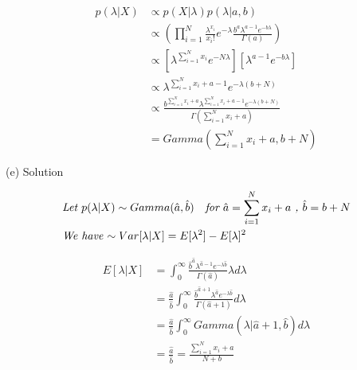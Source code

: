 \documentclass[11pt]{report}
\begin{document}
\begin{equation*}
\begin{split}
p(\lambda|X) &\propto p(X|\lambda) p(\lambda|a,b) \\
&\propto (\prod_{i=1}^N\frac{\lambda^{x_i}}{x_i!} e^{-\lambda} \frac{b^a\lambda^{a-1}e^{-b\lambda}}{\Gamma(a)}) \\
&\propto [\lambda^{\sum_{i=1}^Nx_i} e^{-N\lambda}][\lambda^{a-1}e^{-b\lambda}] \\
&\propto \lambda^{\sum_{i=1}^Nx_i + a - 1} e^{-\lambda(b + N)} \\
&\propto \frac{b^{\sum_{i=1}^Nx_i + a}\lambda^{\sum_{i=1}^Nx_i + a - 1} e^{-\lambda(b + N)}}{\Gamma(\sum_{i=1}^Nx_i + a)} \\
& = \textit{Gamma}(\sum_{i=1}^Nx_i + a, b + N)
\end{split}
\end{equation*}

\justify
(e) Solution

\begin{align*}
&\textit{Let $p(\lambda|X) \sim Gamma(\hat{a}, \hat{b})$ \; for $\hat{a} = \sum_{i=1}^Nx_i + a$ , $\hat{b} = b+ N $} \\
&\textit{We have $\sim Var[\lambda|X] = E[\lambda^2] - E[\lambda]^2$}
\end{align*}

\begin{equation*}
\begin{split}
E[\lambda|X] &= \int^{\infty}_0\frac{ \hat{b}^{\hat{a} } \lambda^{\hat{a} - 1} e^{-\lambda\hat{b}}}{\Gamma(\hat{a})} \lambda d\lambda \\
&= \frac{\hat{a}}{\hat{b}} \int^{\infty}_0 \frac{\hat{b}^{\hat{a} + 1} \lambda^{\hat{a}} e^{-\lambda \hat{b}} }{\Gamma{(\hat{a} + 1)}} d\lambda \\
&= \frac{\hat{a}}{\hat{b}} \int^{\infty}_0 Gamma(\lambda|\hat{a} + 1, \hat{b}) d\lambda \\
&= \frac{\hat{a}}{\hat{b}} = \frac{{\sum_{i=1}^N{x_i}} + a}{N + b} \\
\end{split} 
\end{equation*}
\end{document}

